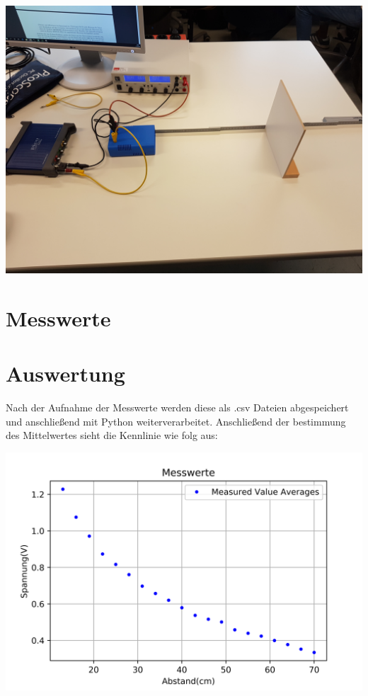 \documentclass[12pt, oneside, a4paper, \docLanguage]{report}
\begin{document}
\begin{normalsize}
\begin{center}
\includegraphics[scale=0.1]{20191021_160106.jpg}
\end{center}
\end{normalsize}


\section{Messwerte}
\label{chap:VERSUCH_1_MESSWERTE}



\section{Auswertung}
\label{chap:VERSUCH_1_AUSWERTUNG}
\begin{normalsize}
Nach der Aufnahme der Messwerte werden diese als .csv Dateien abgespeichert und anschließend mit Python weiterverarbeitet.
Anschließend der bestimmung des Mittelwertes sieht die Kennlinie wie folg aus:\\
\begin{minipage}{\linewidth}
\includegraphics[scale=1]{ExpRegrRaw.png}
\end{minipage}
\end{normalsize}
\end{document}
